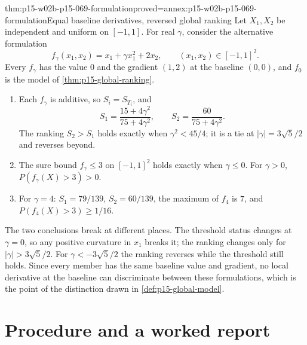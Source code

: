 \begin{hbtheorem}{thm:p15-w02b-p15-069-formulation}{proved=annex:p15-w02b-p15-069-formulation}{Equal baseline derivatives, reversed global ranking}
Let \(X_1,X_2\) be independent and uniform on \([-1,1]\). For real
\(\gamma\), consider the alternative formulation
\[
 f_\gamma(x_1,x_2)=x_1+\gamma x_1^2+2x_2,\qquad (x_1,x_2)\in[-1,1]^2.
\]
Every \(f_\gamma\) has the value \(0\) and the gradient \((1,2)\) at the
baseline \((0,0)\), and \(f_0\) is the model of
\cref{thm:p15-global-ranking}.
\begin{enumerate}
\item Each \(f_\gamma\) is additive, so \(S_i=S_{T_i}\), and
 \[
  S_1=\frac{15+4\gamma^2}{75+4\gamma^2},\qquad
  S_2=\frac{60}{75+4\gamma^2}.
 \]
 The ranking \(S_2>S_1\) holds exactly when \(\gamma^2<45/4\); it is a tie at
 \(|\gamma|=3\sqrt5/2\) and reverses beyond.
\item The sure bound \(f_\gamma\leq3\) on \([-1,1]^2\) holds exactly when
 \(\gamma\leq0\). For \(\gamma>0\), \(P(f_\gamma(X)>3)>0\).
\item For \(\gamma=4\): \(S_1=79/139\), \(S_2=60/139\), the maximum of
 \(f_4\) is \(7\), and \(P(f_4(X)>3)\geq1/16\).
\end{enumerate}
\end{hbtheorem}

The two conclusions break at different places. The threshold status changes
at \(\gamma=0\), so any positive curvature in \(x_1\) breaks it; the ranking
changes only for \(|\gamma|>3\sqrt5/2\). For
\(\gamma<-3\sqrt5/2\) the ranking reverses while the threshold still holds.
Since every member has the same baseline value and gradient, no local
derivative at the baseline can discriminate between these formulations,
which is the point of the distinction drawn in
\cref{def:p15-global-model}.

\section{Procedure and a worked report}

